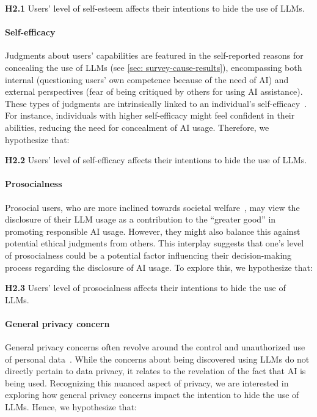 \textbf{H2.1} Users' level of self-esteem affects their intentions to hide the use of LLMs.

\paragraph{Self-efficacy}
Judgments about users' capabilities are featured in the self-reported reasons for concealing the use of LLMs (see \ref{sec: survey-cause-results}), encompassing both internal (questioning users' own competence because of the need of AI) and external perspectives (fear of being critiqued by others for using AI assistance).
These types of judgments are intrinsically linked to an individual's self-efficacy~\cite{bandura1977analysis}. 
For instance, individuals with higher self-efficacy might feel confident in their abilities, reducing the need for concealment of AI usage. 
Therefore, we hypothesize that:

\textbf{H2.2} Users' level of self-efficacy affects their intentions to hide the use of LLMs.

\paragraph{Prosocialness}
Prosocial users, who are more inclined towards societal welfare~\cite{caprara2005new}, may view the disclosure of their LLM usage as a contribution to the ``greater good'' in promoting responsible AI usage. 
However, they might also balance this against potential ethical judgments from others. 
This interplay suggests that one's level of prosocialness could be a potential factor influencing their decision-making process regarding the disclosure of AI usage.
To explore this, we hypothesize that:

\textbf{H2.3} Users' level of prosocialness affects their intentions to hide the use of LLMs.

\paragraph{General privacy concern}
General privacy concerns often revolve around the control and unauthorized use of personal data~\cite{malhotra2004internet}.
While the concerns about being discovered using LLMs do not directly pertain to data privacy, it relates to the revelation of the fact that AI is being used. 
Recognizing this nuanced aspect of privacy, we are interested in exploring how general privacy concerns impact the intention to hide the use of LLMs. 
Hence, we hypothesize that:

